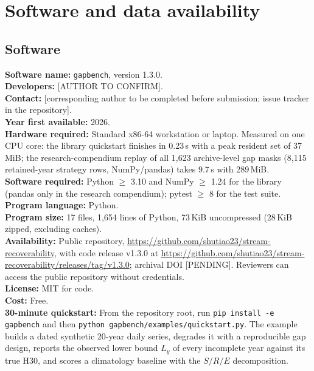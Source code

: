 \section*{Software and data availability}

\subsection*{Software}

\noindent\textbf{Software name:} \texttt{gapbench}, version 1.3.0.\\
\textbf{Developers:} [AUTHOR TO CONFIRM].\\
\textbf{Contact:} [corresponding author to be completed before submission; issue tracker in the repository].\\
\textbf{Year first available:} 2026.\\
\textbf{Hardware required:} Standard x86-64 workstation or laptop. Measured on one CPU core: the library quickstart finishes in 0.23\,s with a peak resident set of 37\,MiB; the research-compendium replay of all 1{,}623 archive-level gap masks (8{,}115 retained-year strategy rows, NumPy/pandas) takes 9.7\,s with 289\,MiB.\\
\textbf{Software required:} Python $\ge$ 3.10 and NumPy $\ge$ 1.24 for the library (pandas only in the research compendium); pytest $\ge$ 8 for the test suite.\\
\textbf{Program language:} Python.\\
\textbf{Program size:} 17 files, 1{,}654 lines of Python, 73\,KiB uncompressed (28\,KiB zipped, excluding caches).\\
\textbf{Availability:} Public repository, \url{https://github.com/shutiao23/stream-recoverability}, with code release v1.3.0 at \url{https://github.com/shutiao23/stream-recoverability/releases/tag/v1.3.0}; archival DOI [PENDING]. Reviewers can access the public repository without credentials.\\
\textbf{License:} MIT for code.\\
\textbf{Cost:} Free.\\
\textbf{30-minute quickstart:} From the repository root, run \texttt{pip install -e gapbench} and then \texttt{python gapbench/examples/quickstart.py}. The example builds a dated synthetic 20-year daily series, degrades it with a reproducible gap design, reports the observed lower bound $L_y$ of every incomplete year against its true H30, and scores a climatology baseline with the $S/R/E$ decomposition.

